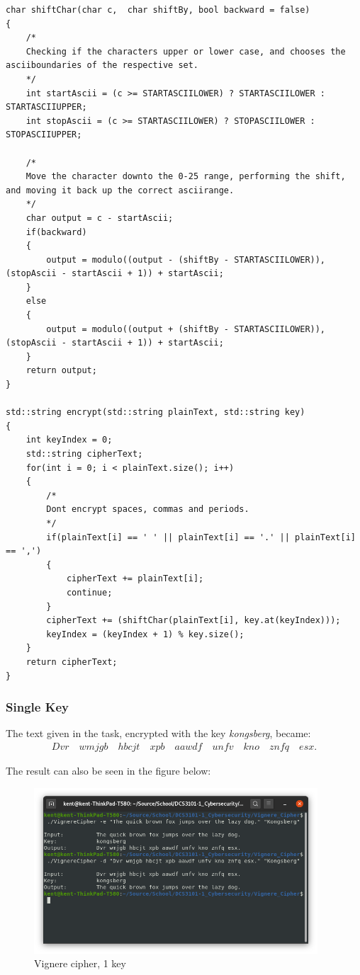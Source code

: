 \documentclass{article}
\begin{document}
\begin{lstlisting}
char shiftChar(char c,  char shiftBy, bool backward = false)
{	
	/*
	Checking if the characters upper or lower case, and chooses the asciiboundaries of the respective set.
	*/
	int startAscii = (c >= STARTASCIILOWER) ? STARTASCIILOWER : STARTASCIIUPPER;
	int stopAscii = (c >= STARTASCIILOWER) ? STOPASCIILOWER : STOPASCIIUPPER;

	/*
	Move the character downto the 0-25 range, performing the shift, and moving it back up the correct asciirange. 
	*/
	char output = c - startAscii;
	if(backward)
	{
		output = modulo((output - (shiftBy - STARTASCIILOWER)), (stopAscii - startAscii + 1)) + startAscii;
	}
	else
	{
		output = modulo((output + (shiftBy - STARTASCIILOWER)), (stopAscii - startAscii + 1)) + startAscii;
	}
	return output;
}

std::string encrypt(std::string plainText, std::string key)
{
	int keyIndex = 0;
	std::string cipherText;
	for(int i = 0; i < plainText.size(); i++)
	{
		/*
		Dont encrypt spaces, commas and periods.
		*/
		if(plainText[i] == ' ' || plainText[i] == '.' || plainText[i] == ',')
		{
			cipherText += plainText[i];
			continue;
		}
		cipherText += (shiftChar(plainText[i], key.at(keyIndex)));
		keyIndex = (keyIndex + 1) % key.size();
	}
	return cipherText;
}
\end{lstlisting}

\subsubsection{Single Key}

The text given in the task, encrypted with the key \textit{kongsberg}, became:
\begin{align*}
Dvr\quad wmjgb\quad hbcjt\quad xpb\quad aawdf\quad unfv\quad kno\quad znfq\quad esx.
\end{align*}

The result can also be seen in the figure below:

\begin{figure}[H]
 \centering
  \includegraphics[width=300pt]{img/vignere1key.png}
 \caption{Vignere cipher, 1 key}
 \end{figure}
\end{document}
